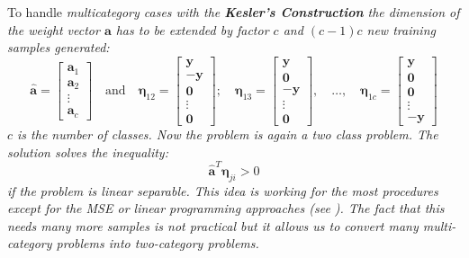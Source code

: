  	To handle \em multicategory cases \em with the \textbf{Kesler's Construction} the dimension of 
 	the weight vector $\bm a$ has to be extended by factor $c$
 	 and $(c-1)c$ new training samples generated:
 	$$ \bm{ \hat{a} }=\begin{bmatrix}
 	\bm a_1\\
 	\bm a_2\\
 	\vdots\\
 	\bm a_c
 	\end{bmatrix} \quad \text{and} \quad \bm \eta_{12}=\begin{bmatrix}
 	\bm y\\
 	-\bm y\\
 	\bm 0\\
 	\vdots\\
 	\bm 0
 	\end{bmatrix}; \quad \bm \eta_{13}=\begin{bmatrix}
 	\bm y\\
 	\bm 0\\
 	- \bm y\\
 	\vdots\\
 	\bm 0
 	\end{bmatrix}, \quad \ldots,\quad \bm \eta_{1c}=\begin{bmatrix}
 	\bm y\\
 	\bm 0\\
 	\bm 0\\
 	\vdots\\
 	-\bm y
 	\end{bmatrix}
 	$$
 	$c$ is the number of classes. Now the problem is again a two class problem. The solution solves the inequality:
 	$$\bm{\hat{a}}^T\bm \eta_{ji}>0$$
 	if the problem is linear separable. 
 	This idea is working for the most procedures except for the MSE or linear programming approaches (see ).
 	The fact that this needs many more samples is not practical but it allows us to convert many 
 	multi-category problems into two-category problems.
 	